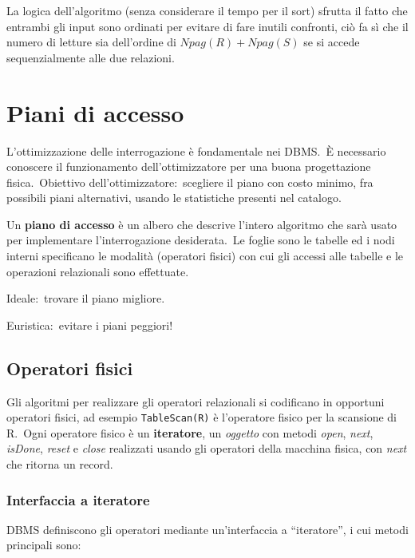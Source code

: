 \noindent La logica dell'algoritmo (senza considerare il tempo per il sort) sfrutta il fatto che entrambi gli input sono ordinati per evitare di fare inutili confronti, ciò fa sì che il numero di letture sia dell'ordine di $\mathit{Npag}(R) + \mathit{Npag}(S)$ se si accede sequenzialmente alle due relazioni.

\section{Piani di accesso}

L'ottimizzazione delle interrogazione è fondamentale nei DBMS.\
È necessario conoscere il funzionamento dell'ottimizzatore per una buona progettazione fisica.\
Obiettivo dell'ottimizzatore:\ scegliere il piano con costo minimo, fra possibili piani alternativi, usando le statistiche presenti nel catalogo.\

Un \textbf{piano di accesso} è un albero che descrive l'intero algoritmo che sarà usato per implementare l'interrogazione desiderata.\
Le foglie sono le tabelle ed i nodi interni specificano le modalità (operatori fisici) con cui gli accessi alle tabelle e le operazioni relazionali sono effettuate.\

\begin{flushleft}
	Ideale:\ trovare il piano migliore.\

	Euristica:\ evitare i piani peggiori!
\end{flushleft}

\subsection{Operatori fisici}

Gli algoritmi per realizzare gli operatori relazionali si codificano in opportuni operatori fisici, ad esempio \texttt{TableScan(R)} è l'operatore fisico per la scansione di R.\
Ogni operatore fisico è un \textbf{iteratore}, un \textit{oggetto} con metodi \textit{open}, \textit{next}, \textit{isDone}, \textit{reset} e \textit{close} realizzati usando gli operatori della macchina fisica, con \textit{next} che ritorna un record.\

\subsubsection{Interfaccia a iteratore}

DBMS definiscono gli operatori mediante un'interfaccia a ``iteratore'', i cui metodi principali sono:

